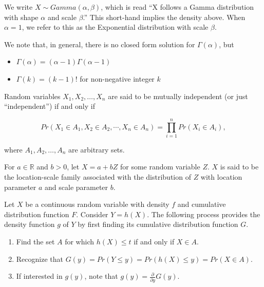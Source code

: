 \documentclass[
  letterpaper,
  DIV=11,
  numbers=noendperiod]{scrreprt}
\providecommand{\tightlist}{%
  \setlength{\itemsep}{0pt}\setlength{\parskip}{0pt}}\usepackage{longtable,booktabs,array}
\theoremstyle{definition}
\theoremstyle{definition}
\theoremstyle{plain}
\theoremstyle{remark}
\begin{document}
We write \(X \sim Gamma\left(\alpha, \beta\right)\), which is read ``X
follows a Gamma distribution with shape \(\alpha\) and scale
\(\beta\).'' This short-hand implies the density above. When
\(\alpha = 1\), we refer to this as the Exponential distribution with
scale \(\beta\).

We note that, in general, there is no closed form solution for
\(\Gamma(\alpha)\), but

\begin{itemize}
\tightlist
\item
  \(\Gamma(\alpha) = (\alpha - 1) \Gamma(\alpha - 1)\)
\item
  \(\Gamma(k) = (k - 1)!\) for non-negative integer \(k\)
\end{itemize}

\begin{description}
\tightlist
\item[Independence (Definition~\ref{def-independence})]
Random variables \(X_1, X_2, \dotsc, X_n\) are said to be mutually
independent (or just ``independent'') if and only if
\end{description}

\[Pr\left(X_1 \in A_1, X_2 \in A_2, \dotsb, X_n \in A_n\right) = \prod_{i=1}^{n} Pr\left(X_i \in A_i\right),\]

where \(A_1, A_2, \dotsc, A_n\) are arbitrary sets.

\begin{description}
\tightlist
\item[Location-Scale Family (Definition~\ref{def-location-scale})]
For \(a \in \mathbb{R}\) and \(b > 0\), let \(X = a + bZ\) for some
random variable \(Z\). \(X\) is said to be the location-scale family
associated with the distribution of \(Z\) with location parameter \(a\)
and scale parameter \(b\).
\item[Method of Distribution Functions
(Definition~\ref{def-method-of-distribution-functions})]
Let \(X\) be a continuous random variable with density \(f\) and
cumulative distribution function \(F\). Consider \(Y = h(X)\). The
following process provides the density function \(g\) of \(Y\) by first
finding its cumulative distribution function \(G\).
\end{description}

\begin{enumerate}
\def\labelenumi{\arabic{enumi}.}
\tightlist
\item
  Find the set \(A\) for which \(h(X) \leq t\) if and only if
  \(X \in A\).
\item
  Recognize that
  \(G(y) = Pr(Y \leq y) = Pr\left(h(X) \leq y\right) = Pr(X \in A)\).
\item
  If interested in \(g(y)\), note that
  \(g(y) = \frac{\partial}{\partial y} G(y)\).
\end{enumerate}
\end{document}
